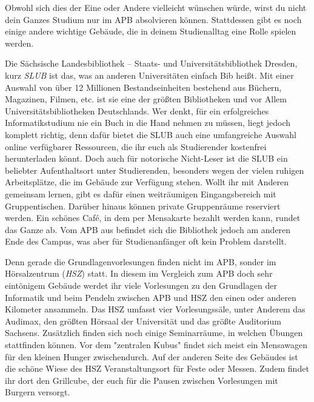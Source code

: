 
Obwohl sich dies der Eine oder Andere vielleicht wünschen würde, wirst du nicht dein Ganzes Studium nur im APB absolvieren können.
Stattdessen gibt es noch einige andere wichtige Gebäude, die in deinem Studienalltag eine Rolle spielen werden.


Die Sächsische Landesbibliothek – Staats- und Universitätsbibliothek Dresden, kurz \emph{SLUB} ist das, was an anderen Universitäten einfach Bib heißt.
Mit einer Auswahl von über 12 Millionen Bestandseinheiten bestehend aus Büchern, Magazinen, Filmen, etc. ist sie eine der größten Bibliotheken und vor Allem Universitätsbibliotheken Deutschlands.
Wer denkt, für ein erfolgreiches Informatikstudium nie ein Buch in die Hand nehmen zu müssen, liegt jedoch komplett richtig, denn dafür bietet die SLUB auch eine umfangreiche Auswahl online verfügbarer Ressourcen, die ihr euch als Studierender kostenfrei herunterladen könnt.
Doch auch für notorische Nicht-Leser ist die SLUB ein beliebter Aufenthaltsort unter Studierenden, besonders wegen der vielen ruhigen Arbeitsplätze, die im Gebäude zur Verfügung stehen.
Wollt ihr mit Anderen gemeinsam lernen, gibt es dafür einen weiträumigen Eingangsbereich mit Gruppentischen.
Darüber hinaus können private Gruppenräume reserviert werden. Ein schönes Café, in dem per Mensakarte bezahlt werden kann, rundet das Ganze ab.
Vom APB aus befindet sich die Bibliothek jedoch am anderen Ende des Campus, was aber für Studienanfänger oft kein Problem darstellt.


Denn gerade die Grundlagenvorlesungen finden nicht im APB, sonder im Hörsalzentrum (\emph{HSZ}) statt.
In diesem im Vergleich zum APB doch sehr eintönigem Gebäude werdet ihr viele Vorlesungen zu den Grundlagen der Informatik und beim Pendeln zwischen APB und HSZ den einen oder anderen Kilometer ansammeln.
Das HSZ umfasst vier Vorlesungssäle, unter Anderem das Audimax, den größten Hörsaal der Universität und das größte Auditorium Sachsens.
Zusätzlich finden sich noch einige Seminarräume, in welchen Übungen stattfinden können. Vor dem "zentralen Kubus" findet sich meist ein Mensawagen für den kleinen Hunger zwischendurch.
Auf der anderen Seite des Gebäudes ist die schöne Wiese des HSZ Veranstaltungsort für Feste oder Messen.
Zudem findet ihr dort den Grillcube, der euch für die Pausen zwischen Vorlesungen mit Burgern versorgt.


